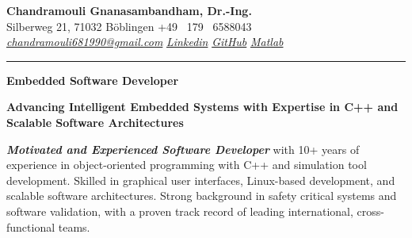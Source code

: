 \documentclass[a4paper,10pt]{article}
\newcommand{\link}[1]{{\textit{#1}}}
\begin{document}
\thispagestyle{plain}

\begin{center}
    {\Large \textbf{Chandramouli Gnanasambandham, Dr.-Ing.}}\\ 
    
    \vspace{0.2cm}
    \small Silberweg 21, 71032 B\"oblingen \hfill  \bullet  \hfill  +49 \ 179 \ 6588043 \hfill \bullet  \hfill
    \textup{\href{mailto:chandramouli681990@gmail.com}{\link{chandramouli681990@gmail.com}}} \hfill \bullet \hfill
    \textup{\href{https://linkedin.com/in/ganasambandhamc}{\link{Linkedin}}} \hfill \bullet \hfill
    \textup{\href{https://github.com/chandramouli6890}{\link{GitHub}}} \hfill \bullet \hfill
    \textup{\href{https://de.mathworks.com/matlabcentral/profile/authors/4267772}{\link{Matlab}}}

    \vspace{-0.2cm}
    {\rule{\linewidth}{0.8pt}}

    \vspace{0.2cm}
    {\Large \textbf{Embedded Software Developer}}
    
    \vspace{0.1cm}
    \colorbox{gray!40}{%
        \parbox{0.99\textwidth}{%
            \centering \textcolor{highlightcolor}{\textbf{Advancing Intelligent Embedded Systems with Expertise in C++ and Scalable Software Architectures}}
        }%
    }
\end{center}


\noindent \textcolor{highlightcolor}{\textit{\textbf{Motivated and Experienced
Software Developer}}} with 10+ years of experience in object-oriented
programming with C++ and simulation tool development. Skilled in graphical user
interfaces, Linux-based development, and scalable software
architectures. Strong background in safety critical systems and software
validation, with a proven track record of leading international,
cross-functional teams.
\end{document}
